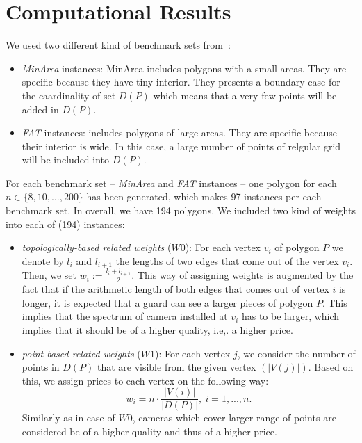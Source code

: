 \documentclass[runningheads,a4paper]{elsarticle}
\begin{document}
	\section{Computational Results}

 We used two different kind of benchmark sets from~\cite{tomas2006visibility}:
     \begin{itemize}
     	 \item \emph{MinArea} instances: MinArea includes polygons with a small areas. They are specific because they have tiny interior. They presents a boundary case for the caardinality of set $D(P)$ which means that a very few points will be added in $D(P)$. 
     	 \item \emph{FAT} instances:  includes polygons of large areas. They are specific because their interior is wide. In this case, a large number of points of relgular grid will be included into $D(P)$. 
     \end{itemize}
     For each benchmark set -- \emph{MinArea} and \emph{FAT} instances -- one polygon for each $n \in\{8,10,...,200\}$ has been generated, which makes 97 instances per each benchmark set. In overall, we have 194 polygons.
	We included two kind of weights into each of (194) instances:
	\begin{itemize}
		\item \emph{topologically-based related weights} ($W0$): For each vertex $v_i$ of polygon $P$ we denote by $l_i$ and $l_{i+1}$ the lengths of two edges that come out of the vertex $v_i$. Then, we set $w_i := \frac{l_i + l_{i+1}}{2}$. This way of assigning weights is augmented by the fact that if the arithmetic length of both edges that comes out of vertex $i$ is longer, it is expected that a guard can see a larger pieces of polygon $P$. This implies that the spectrum of camera installed at $v_i$ has to be larger, which implies that it should be of a higher quality, i.e,. a higher price.
		\item \emph{point-based related weights} ($W1$): For each vertex $j$, we consider the number of points in $D(P)$ that are visible from the given vertex $(|V(j)|)$. Based on this, we assign prices to each vertex on the following way:
		\begin{equation}
		w_i = n \cdot \frac{|V(i)|}{|D(P)|},\ i=1,...,n.
		\end{equation}
    Similarly as in case of $W0$, cameras which cover larger range of points are considered be of a higher quality and thus of a higher price.
	\end{itemize}
\end{document}
